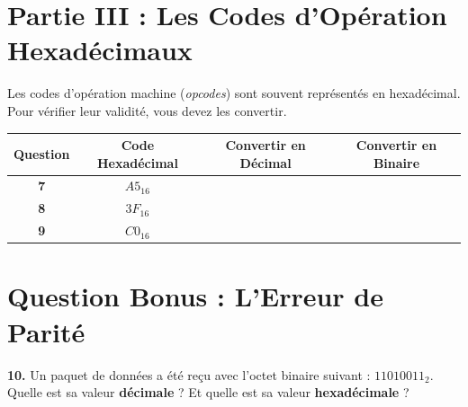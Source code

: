 \vspace{0.5cm}

\section*{Partie III : Les Codes d'Opération Hexadécimaux}

Les codes d'opération machine (\textit{opcodes}) sont souvent représentés en hexadécimal. Pour vérifier leur validité, vous devez les convertir.

\begin{center}
\begin{tabular}{|c|c|c|c|}
    \hline
    \textbf{Question} & \textbf{Code Hexadécimal} & \textbf{Convertir en Décimal } & \textbf{Convertir en Binaire } \\
    \hline
    \textbf{7} & $A5_{16}$ & & \\
    \hline
    \textbf{8} & $3F_{16}$ & & \\
    \hline
    \textbf{9} & $C0_{16}$ & & \\
    \hline
\end{tabular}
\end{center}

\vspace{0.5cm}

\section*{Question Bonus : L'Erreur de Parité}

\textbf{10.} Un paquet de données a été reçu avec l'octet binaire suivant : $11010011_2$. Quelle est sa valeur \textbf{décimale} ? Et quelle est sa valeur \textbf{hexadécimale} ?



